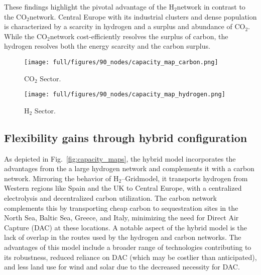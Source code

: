 \documentclass[twocolumn]{article}
\newcommand{\carbon}{CO$_2$}
\newcommand{\hydrogen}{H$_2$}
\newcommand{\hydrogengrid}{\hydrogen{}--Grid}
\begin{document}
These findings highlight the pivotal advantage of the \hydrogen network in contrast to the \carbon network. Central Europe with its industrial clusters and dense population is characterized by a scarcity in hydrogen and a surplus and abundance of \carbon. While the \carbon network cost-efficiently resolves the surplus of carbon, the hydrogen resolves both the energy scarcity and the carbon surplus.

\begin{figure*}[h]
    \centering
    \begin{subfigure}{.5\textwidth}
        \centering
        \texttt{[image: full/figures/90\_nodes/capacity\_map\_carbon.png]}
        \caption{\carbon{} Sector.}
        \label{fig:capacity_map_carbon_co2}
    \end{subfigure}%
    \hfill
    \begin{subfigure}{.5\textwidth}
        \centering
        \texttt{[image: full/figures/90\_nodes/capacity\_map\_hydrogen.png]}
        \caption{\hydrogen{} Sector.}
        \label{fig:capacity_map_hydrogen_co2}
    \end{subfigure}
    \caption{Optimal production and transport capacities of the carbon and hydrogen sector in a net-zero energy system in Europe with both \carbon{} and \hydrogen{} network expansion (Hybrid).
    }
    \label{fig:capacity_maps}
\end{figure*}


\subsection*{Flexibility gains through hybrid configuration}

As depicted in Fig.~\ref{fig:capacity_maps}, the hybrid model incorporates the advantages from the a large hydrogen network and complements it with a carbon network. Mirroring the behavior of \hydrogengrid model, it transports hydrogen from Western regions like Spain and the UK to Central Europe, with a centralized electrolysis and decentralized carbon utilization. The carbon network complements this by transporting cheap carbon to sequestration sites in the North Sea, Baltic Sea, Greece, and Italy, minimizing the need for Direct Air Capture (DAC) at these locations. A notable aspect of the hybrid model is the lack of overlap in the routes used by the hydrogen and carbon networks. The advantages of this model include a broader range of technologies contributing to its robustness, reduced reliance on DAC (which may be costlier than anticipated), and less land use for wind and solar due to the decreased necessity for DAC.
\end{document}
